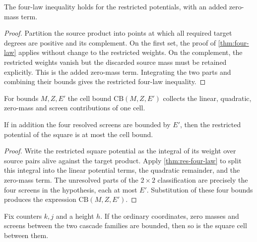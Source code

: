 \begin{lemma}
\label{thm:res-four-law}
\leanok
{}
The four-law inequality holds for the restricted potentials, with an added zero-mass term.
\end{lemma}

\begin{proof}
\leanok
{}
Partition the source product into points at which all required target degrees are positive and its
complement. On the first set, the proof of \cref{thm:four-law} applies without change to the
restricted weights. On the complement, the restricted weights vanish but the discarded source
mass must be retained explicitly. This is the added zero-mass term. Integrating the two parts and
combining their bounds gives the restricted four-law inequality.
\end{proof}

\begin{definition}
\label{def:cellCB}
\leanok
{}
For bounds $M,Z,E'$ the cell bound $\mathrm{CB}(M,Z,E')$ collects the linear, quadratic,
zero-mass and screen contributions of one cell.
\end{definition}

\begin{lemma}
\label{thm:one-cell}
\leanok
{}
If in addition the four resolved screens are bounded by $E'$, then the restricted potential of
the square is at most the cell bound.
\end{lemma}

\begin{proof}
\leanok
{}
Write the restricted square potential as the integral of its weight over source pairs alive
against the target product. Apply \cref{thm:res-four-law} to split this integral into the linear
potential terms, the quadratic remainder, and the zero-mass term. The unresolved parts of the
$2\times2$ classification are precisely the four screens in the hypothesis, each at most $E'$.
Substitution of these four bounds produces the expression $\mathrm{CB}(M,Z,E')$.
\end{proof}

\begin{lemma}
\label{thm:psirow-square}
\leanok
{}
Fix counters $k,j$ and a height $h$. If the ordinary coordinates, zero masses and screens
between the two cascade families are bounded, then so is the square cell between them.
\end{lemma}

